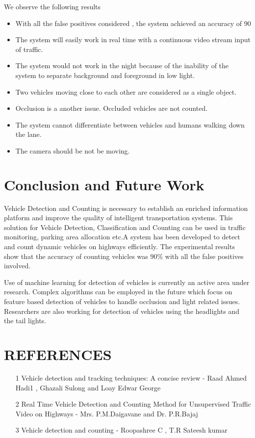 \documentclass[12pt, a4paper]{article}
\begin{document}
\hspace{3cm}
We observe the following results
\begin{itemize}
\item With all the false positives considered , the system achieved an accuracy of 90%
\item The system will easily work in real time with a continuous video stream input of traffic.
\item The system would not work in the night because of the inability of the system to separate background and foreground in low light.
\item Two vehicles moving close to each other are considered as a single object.
\item Occlusion is a another issue. Occluded vehicles are not counted.
\item The system cannot differentiate between vehicles and humans walking down the lane.
\item The camera should be not be moving.
\end{itemize}

\newpage
\section{Conclusion and Future Work}
\hspace{3cm}
Vehicle Detection and Counting is necessary to establish an enriched information platform and improve the quality of intelligent transportation systems. This solution for
Vehicle Detection, Classification and Counting can be used in traffic monitoring, parking area allocation etc.A system has been developed to detect and count dynamic vehicles on highways efficiently. The experimental results show that the accuracy of counting vehicles was 90\% with all the false positives involved.
\par Use of machine learning for detection of vehicles is currently an active area under research. Complex algorithms can be employed in the future which focus on feature based detection of vehicles to handle occlusion and light related issues. Researchers are also working for detection of vehicles using the headlights and the tail lights.

\newpage
\section{REFERENCES}
\begin{itemize}

\item [1] Vehicle detection and tracking techniques: A concise review - Raad Ahmed Hadi1 , Ghazali Sulong and Loay Edwar George
\item [2] Real Time Vehicle Detection and Counting Method for Unsupervised Traffic Video on Highways - Mrs. P.M.Daigavane and Dr. P.R.Bajaj
\item [3] Vehicle detection and counting - Roopashree C , T.R Sateesh kumar



\end{itemize}
\end{document}
